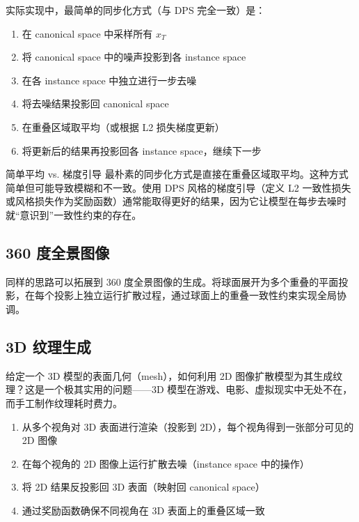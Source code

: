 \documentclass[a4paper]{article}
\begin{document}
实际实现中，最简单的同步化方式（与 DPS 完全一致）是：

\begin{enumerate}
    \item 在 canonical space 中采样所有 $x_T$
    \item 将 canonical space 中的噪声投影到各 instance space
    \item 在各 instance space 中独立进行一步去噪
    \item 将去噪结果投影回 canonical space
    \item 在重叠区域取平均（或根据 L2 损失梯度更新）
    \item 将更新后的结果再投影回各 instance space，继续下一步
\end{enumerate}

\begin{warningbox}{简单平均 vs. 梯度引导}
最朴素的同步化方式是直接在重叠区域取平均。这种方式简单但可能导致模糊和不一致。使用 DPS 风格的梯度引导（定义 L2 一致性损失或风格损失作为奖励函数）通常能取得更好的结果，因为它让模型在每步去噪时就``意识到''一致性约束的存在。
\end{warningbox}

\subsection{360 度全景图像}

同样的思路可以拓展到 360 度全景图像的生成。将球面展开为多个重叠的平面投影，在每个投影上独立运行扩散过程，通过球面上的重叠一致性约束实现全局协调。

\subsection{3D 纹理生成}

给定一个 3D 模型的表面几何（mesh），如何利用 2D 图像扩散模型为其生成纹理？这是一个极其实用的问题——3D 模型在游戏、电影、虚拟现实中无处不在，而手工制作纹理耗时费力。

\begin{enumerate}
    \item 从多个视角对 3D 表面进行渲染（投影到 2D），每个视角得到一张部分可见的 2D 图像
    \item 在每个视角的 2D 图像上运行扩散去噪（instance space 中的操作）
    \item 将 2D 结果反投影回 3D 表面（映射回 canonical space）
    \item 通过奖励函数确保不同视角在 3D 表面上的重叠区域一致
\end{enumerate}
\end{document}
